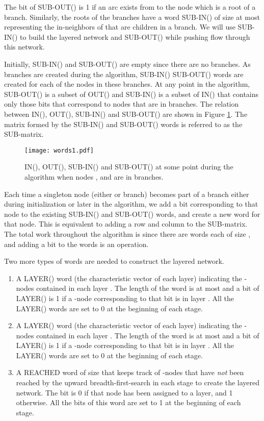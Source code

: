 \documentclass{article}
\begin{document}
The  bit of SUB-OUT() is 1 if an arc exists from  to the  node which is a root of a  branch. Similarly, the roots of the  branches have a word SUB-IN() of size at most  representing the in-neighbors of  that are children in a  branch.  We will use SUB-IN() to build the layered network and SUB-OUT() while pushing flow through this network.

Initially, SUB-IN() and SUB-OUT() are empty since there are no  branches.  As  branches are created during the algorithm, SUB-IN() SUB-OUT() words are created for each of the nodes in these branches. At any point in the algorithm, SUB-OUT() is a subset of OUT() and SUB-IN() is a subset of IN() that contains only those bits that correspond to nodes that are in  branches. The relation between IN(), OUT(), SUB-IN() and SUB-OUT() are shown in Figure \ref{fig:words1}. The matrix formed by the SUB-IN() and SUB-OUT() words is referred to as the SUB-matrix.

\begin{figure}[ht]
\centerline{\texttt{[image: words1.pdf]}}
\caption{\label{fig:words1}IN(), OUT(), SUB-IN() and SUB-OUT() at some point during the algorithm when nodes , and  are in  branches.}
\end{figure}

Each time a singleton node (either  or  branch) becomes part of a  branch either during initialization or later in the algorithm, we add a bit corresponding to that node to the existing SUB-IN() and SUB-OUT() words, and create a new word for that node. This is equivalent to adding a row and column to the SUB-matrix. The total work  throughout the algorithm is  since there are  words each of size , and adding a bit to the words is an  operation.

Two more types of words are needed to construct the layered network.
\begin{enumerate}
\item A LAYER() word (the characteristic vector of each layer) indicating the -nodes contained in each layer .  The length of the word is at most  and a bit of LAYER() is 1 if a -node corresponding to that bit is in layer . All the LAYER() words are set to 0 at the beginning of each stage.
\item A LAYER() word (the characteristic vector of each layer) indicating the -nodes contained in each layer . The length of the word is at most  and a bit of LAYER() is 1 if a -node corresponding to that bit is in layer . All the LAYER() words are set to 0 at the beginning of each stage.
\item A REACHED word of size  that keeps track of -nodes that have {\em not} been reached by the upward breadth-first-search in each stage to create the layered network. The  bit is 0 if that node has been assigned to a layer, and 1 otherwise. All the bits of this word are set to 1 at the beginning of each stage.
\end{enumerate}
\end{document}
